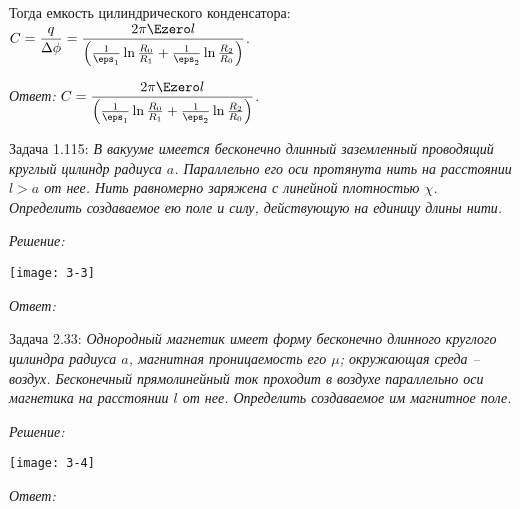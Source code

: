 Тогда емкость цилиндрического конденсатора: \( \ds C = \frac{q}{\Delta\phi} =
\frac{2\pi\Ezero l}{\left(\frac{1}{\eps_1}\ln\frac{R_0}{R_1} + \frac{1}{\eps_2}
\ln\frac{R_2}{R_0}\right)} \).

\emph{Ответ:} \( \ds C =\frac{2\pi\Ezero l}{\left(\frac{1}{\eps_1}
\ln\frac{R_0}{R_1} + \frac{1}{\eps_2}\ln\frac{R_2}{R_0}\right)} \).

\newpage
Задача 1.115: \emph{В вакууме имеется бесконечно длинный заземленный проводящий
круглый цилиндр радиуса \( a \). Параллельно его оси протянута нить на
расстоянии \( l > a \) от нее. Нить равномерно заряжена с линейной плотностью
\( \chi \). Определить создаваемое ею поле и силу, действующую на единицу длины
нити.}

\vspace*{2em}
\emph{Решение:}

\begin{minipage}{.4\textwidth}
    \texttt{[image: 3-3]}
\end{minipage}
\begin{minipage}{.55\textwidth}
\end{minipage}

\vspace*{2em}
\emph{Ответ:}

\newpage
Задача 2.33: \emph{Однородный магнетик имеет форму бесконечно длинного
круглого цилиндра радиуса \( a \), магнитная проницаемость его \( \mu \);
окружающая среда -- воздух. Бесконечный прямолинейный ток проходит в воздухе
параллельно оси магнетика на расстоянии \( l \) от нее. Определить создаваемое
им магнитное поле.}

\vspace*{2em}
\emph{Решение:}

\begin{minipage}{.4\textwidth}
    \texttt{[image: 3-4]}
\end{minipage}
\begin{minipage}{.55\textwidth}
\end{minipage}

\vspace*{2em}
\emph{Ответ:}


